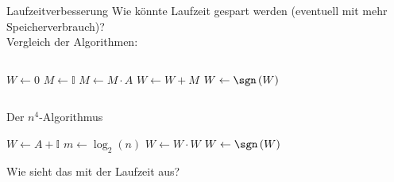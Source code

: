 \begin{frame}{Laufzeitverbesserung}
    Wie könnte Laufzeit gespart werden (eventuell mit mehr Speicherverbrauch)? \\
    Vergleich der Algorithmen:
    \begin{columns}
        \begin{column}{.5\textwidth}
            \begin{algorithm}
                \begin{algorithmic}
                    \State $W \gets 0$ 
                        \State $M \gets \mathbb{I}$ 
                            \State $M \gets M\cdot A$
                        \EndFor
                        \State $W \gets W + M$ 
                    \EndFor
                    \State $W \gets \sgn\left( W \right)$
                \end{algorithmic}
            \end{algorithm}
        \end{column}
    \end{columns}
\end{frame}

\begin{frame}{Der $n^4$-Algorithmus}
    \begin{algorithm}
        \begin{algorithmic}
            \State $W\gets A + \mathbb{I}$
            \State $m \gets \log_2\left( n \right)$
                \State $W \gets W\cdot W$
            \EndFor
            \State $W\gets \sgn\left( W \right)$
        \end{algorithmic}
    \end{algorithm}
    Wie sieht das mit der Laufzeit aus?
\end{frame}

